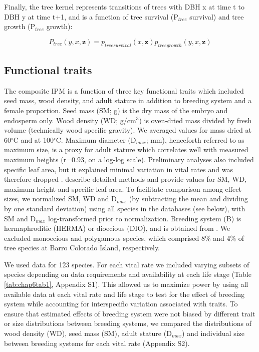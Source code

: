 \documentclass[b5paper,justified]{tufte-book} %
\begin{document}
\begin{fullwidth}
Finally, the tree kernel represents transitions of trees with DBH x at time t to DBH y at time t+1, and is a function of tree survival (P$_{tree}$ survival) and tree growth (P$_{tree}$ growth):

\begin{equation}
P_{tree} (y,x,\textbf{z})=p_{tree survival}(x,\textbf{z})p_{tree growth}(y,x,\textbf{z})
\label{eq:chap6eq6} 
\end{equation}

\subsection{Functional traits}
The composite IPM is a function of three key functional traits \citep{Visser2016} which included seed mass, wood density, and adult stature in addition to breeding system and a female proportion. Seed mass (SM; g) is the dry mass of the embryo and endosperm only. Wood density (WD; g/cm$^3$) is oven-dried mass divided by fresh volume (technically wood specific gravity). We averaged values for mass dried at 60$^\circ$C and at 100$^\circ$C. Maximum diameter (D$_{max}$; mm), henceforth referred to as maximum size, is a proxy for adult stature which correlates well with measured maximum heights (r=0.93, on a log-log scale). Preliminary analyses also included specific leaf area, but it explained minimal variation in vital rates and was therefore dropped \citep{Visser2016}. \citet{Wright2010} describe detailed methods and provide values for SM, WD, maximum height and specific leaf area. To facilitate comparison among effect sizes, we normalized SM, WD and D$_{max}$ (by subtracting the mean and dividing by one standard deviation) using all species in the databases (see below), with SM and D$_{max}$ log-transformed prior to normalization. Breeding system (B) is hermaphroditic (HERMA) or dioecious (DIO), and is obtained from \citet{Croat1978}. We excluded monoecious and polygamous species, which comprised 8\% and 4\% of tree species at Barro Colorado Island, respectively.  

We used data for 123 species. For each vital rate we included varying subsets of species depending on data requirements and availability at each life stage (Table \ref{tab:chap6tab1}, Appendix S1). This allowed us to maximize power by using all available data at each vital rate and life stage to test for the effect of breeding system while accounting for interspecific variation associated with traits. To ensure that estimated effects of breeding system were not biased by different trait or size distributions between breeding systems, we compared the distributions of wood density (WD), seed mass (SM), adult stature (D$_{max}$) and individual size between breeding systems for each vital rate (Appendix S2).


\end{fullwidth}
\end{document}
